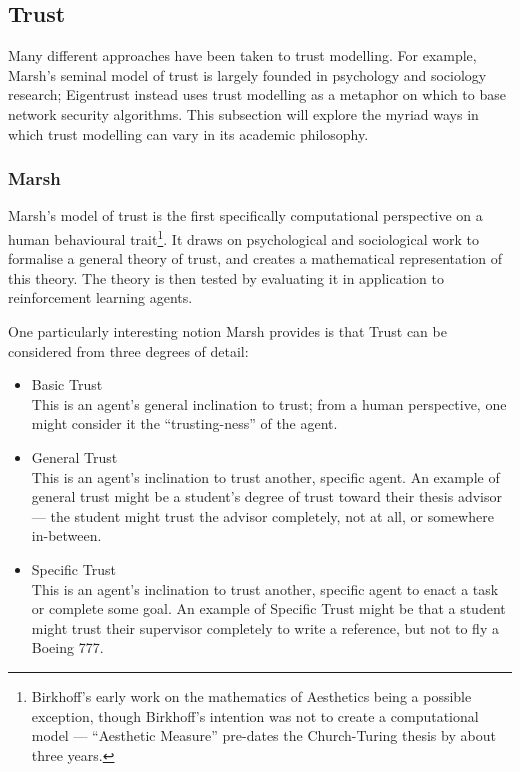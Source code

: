 \subsection*{Trust}\label{sec:trust}
Many different approaches have been taken to trust modelling. For example, Marsh's seminal model of trust\cite{marsh1994} is largely founded in psychology and sociology research; Eigentrust\cite{Kamvar2003} instead uses trust modelling as a metaphor on which to base network security algorithms. This subsection will explore the myriad ways in which trust modelling can vary in its academic philosophy.\par

\subsubsection*{Marsh}\label{sec:marsh}
Marsh's model of trust is the first specifically computational perspective on a human behavioural trait\footnote{Birkhoff's early work on the mathematics of Aesthetics\cite{Birkhoff1933} being a possible exception, though Birkhoff's intention was not to create a computational model --- ``Aesthetic Measure'' pre-dates the Church-Turing thesis by about three years.}. It draws on psychological and sociological work to formalise a general theory of trust, and creates a mathematical representation of this theory. The theory is then tested by evaluating it in application to reinforcement learning agents.\par

One particularly interesting notion Marsh provides is that Trust can be considered from three degrees of detail:
\begin{itemize}
    \item Basic Trust\\
        This is an agent's general inclination to trust; from a human perspective, one might consider it the ``trusting-ness'' of the agent.
    \item General Trust\\
        This is an agent's inclination to trust another, specific agent. An example of general trust might be a student's degree of trust toward their thesis advisor --- the student might trust the advisor completely, not at all, or somewhere in-between.
    \item Specific Trust\\
        This is an agent's inclination to trust another, specific agent to enact a task or complete some goal. An example of Specific Trust might be that a student might trust their supervisor completely to write a reference, but not to fly a Boeing 777.
\end{itemize}

